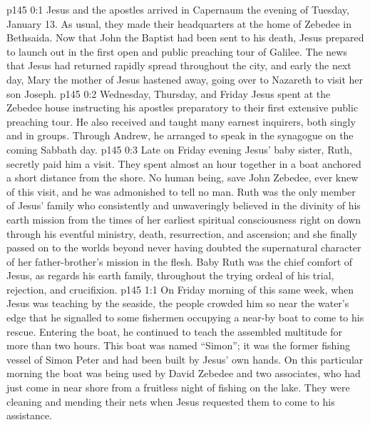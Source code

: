 \author{Midwayer Commission}
\vs p145 0:1 Jesus and the apostles arrived in Capernaum the evening of Tuesday, January 13. As usual, they made their headquarters at the home of Zebedee in Bethsaida. Now that John the Baptist had been sent to his death, Jesus prepared to launch out in the first open and public preaching tour of Galilee. The news that Jesus had returned rapidly spread throughout the city, and early the next day, Mary the mother of Jesus hastened away, going over to Nazareth to visit her son Joseph.
\vs p145 0:2 Wednesday, Thursday, and Friday Jesus spent at the Zebedee house instructing his apostles preparatory to their first extensive public preaching tour. He also received and taught many earnest inquirers, both singly and in groups. Through Andrew, he arranged to speak in the synagogue on the coming Sabbath day.
\vs p145 0:3 Late on Friday evening Jesus’ baby sister, Ruth, secretly paid him a visit. They spent almost an hour together in a boat anchored a short distance from the shore. No human being, save John Zebedee, ever knew of this visit, and he was admonished to tell no man. Ruth was the only member of Jesus’ family who consistently and unwaveringly believed in the divinity of his earth mission from the times of her earliest spiritual consciousness right on down through his eventful ministry, death, resurrection, and ascension; and she finally passed on to the worlds beyond never having doubted the supernatural character of her father\hyp{}brother’s mission in the flesh. Baby Ruth was the chief comfort of Jesus, as regards his earth family, throughout the trying ordeal of his trial, rejection, and crucifixion.
\vs p145 1:1 On Friday morning of this same week, when Jesus was teaching by the seaside, the people crowded him so near the water’s edge that he signalled to some fishermen occupying a near\hyp{}by boat to come to his rescue. Entering the boat, he continued to teach the assembled multitude for more than two hours. This boat was named “Simon”; it was the former fishing vessel of Simon Peter and had been built by Jesus’ own hands. On this particular morning the boat was being used by David Zebedee and two associates, who had just come in near shore from a fruitless night of fishing on the lake. They were cleaning and mending their nets when Jesus requested them to come to his assistance.
